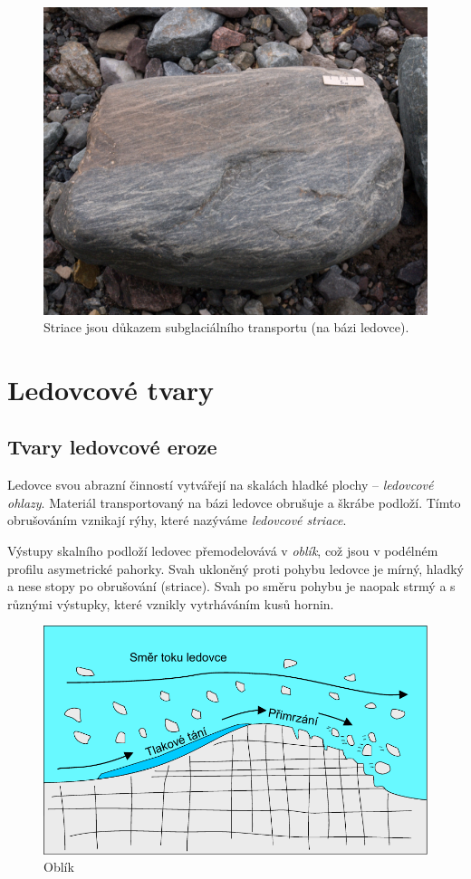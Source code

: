 \begin{figure}
	\centering
	\includegraphics[width=1\linewidth]{obrazky/glac/striace}
	\caption{Striace jsou důkazem subglaciálního transportu (na bázi ledovce).}
	\label{fig:striace}
\end{figure}


\section{Ledovcové tvary}
\subsection{Tvary ledovcové eroze}
Ledovce svou abrazní činností vytvářejí na skalách hladké plochy -- \emph{ledovcové ohlazy}. Materiál transportovaný na bázi ledovce obrušuje a škrábe podloží. Tímto obrušováním vznikají rýhy, které nazýváme \emph{ledovcové striace}. 

Výstupy skalního podloží ledovec přemodelovává v \emph{oblík}, což jsou v podélném profilu asymetrické pahorky. Svah ukloněný proti pohybu ledovce je mírný, hladký a nese stopy po obrušování (striace). Svah po směru pohybu je naopak strmý a s různými výstupky, které vznikly vytrháváním kusů hornin. 

\begin{figure}
	\centering
	\includegraphics[width=1\linewidth]{obrazky/glac/oblik}
	\caption{Oblík}
	\label{fig:oblik}
\end{figure}

